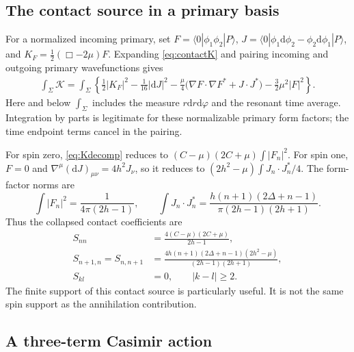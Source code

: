 \documentclass[11pt,a4paper]{article}
\numberwithin{equation}{section}
\theoremstyle{remark}\newtheorem{remark}[theorem]{Remark}
\newcommand{\dd}{\mathrm d}
\newcommand{\ket}[1]{|#1\rangle}
\newcommand{\bra}[1]{\langle#1|}
\begin{document}
\subsection{The contact source in a primary basis}

For a normalized incoming primary, set $F=\bra0\phi_1\phi_2\ket P$,
$J=\bra0\phi_1\dd\phi_2-\phi_2\dd\phi_1\ket P$, and
$K_F=\frac12(\Box-2\mu)F$. Expanding \eqref{eq:contactK} and pairing incoming and outgoing primary wavefunctions gives
\begin{align}
 \int_\Sigma\mathcal K
 =\int_\Sigma\left\{
 \frac12|K_F|^2-\frac1{16}|\dd J|^2
 -\frac\mu4\bigl(\nabla F\cdot\nabla F^*+J\cdot J^*\bigr)
 -\frac32\mu^2|F|^2\right\}.
 \label{eq:Kdecomp}
\end{align}
Here and below $\int_\Sigma$ includes the measure $r\dd r\dd\varphi$ and the resonant time average. Integration by parts is legitimate for these normalizable primary form factors; the time endpoint terms cancel in the pairing.

For spin zero, \eqref{eq:Kdecomp} reduces to
$(C-\mu)(2C+\mu)\int|F_n|^2$. For spin one, $F=0$ and
$\nabla^\mu(\dd J)_{\mu\nu}=4h^2J_\nu$, so it reduces to
$(2h^2-\mu)\int J_n\cdot J_n^*/4$. The form-factor norms are
\begin{equation}
 \int|F_n|^2=\frac1{4\pi(2h-1)},\qquad
 \int J_n\cdot J_n^*=\frac{h(n+1)(2\Delta+n-1)}{\pi(2h-1)(2h+1)}.
\end{equation}
Thus the collapsed contact coefficients are
\begin{align}
 S_{nn}&=\frac{4(C-\mu)(2C+\mu)}{2h-1},\label{eq:S0}\\
 S_{n+1,n}=S_{n,n+1}
 &=\frac{4h(n+1)(2\Delta+n-1)(2h^2-\mu)}{(2h-1)(2h+1)},\label{eq:S1}\\
 S_{kl}&=0,\qquad |k-l|\geq2.\label{eq:Shigh}
\end{align}
The finite support of this contact source is particularly useful. It is not the same spin support as the annihilation contribution.

\subsection{A three-term Casimir action}
\end{document}
